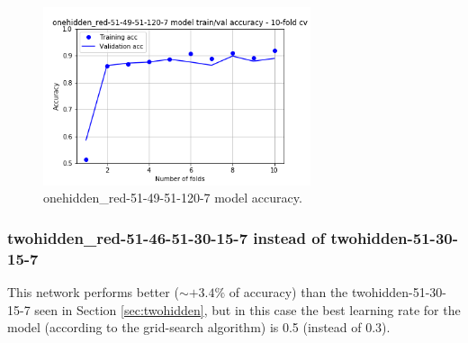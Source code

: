 \begin{figure} [H]
\centering
\includegraphics[width=0.7\textwidth]{./TeX_files/img/m1_auto_acc.png}
\caption{onehidden\_red-51-49-51-120-7 model accuracy.}
\label{fig:m1automodelacc}
\end{figure}

\subsubsection{twohidden\_red-51-46-51-30-15-7 instead of twohidden-51-30-15-7}
This network performs better ($\sim +3.4\%$ of accuracy) than the twohidden-51-30-15-7 seen in Section \ref{sec:twohidden}, but in this case the best learning rate for the model (according to the grid-search algorithm) is 0.5 (instead of 0.3).

\begin{table}[H]
\centering
{}
\caption{Precision, recall, f1-score summary table for twohidden\_red-51-46-51-30-15-7.}
\end{table}


